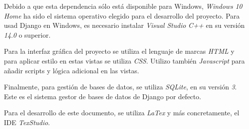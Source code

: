 Debido a que esta dependencia sólo está disponible para Windows, \textit{Windows 10 Home} ha sido el sistema operativo elegido para el desarrollo del proyecto. Para usad Django en Windows, es necesario instalar \textit{Visual Studio C++} en su versión \textit{14.0} o superior. \newline

Para la interfaz gráfica del proyecto se utiliza el lenguaje de marcas \textit{HTML} y para aplicar estilo en estas vistas se utiliza \textit{CSS}. Utilizo también \textit{Javascript} para añadir scripts y lógica adicional en las vistas.\newline

Finalmente, para gestión de bases de datos, se utiliza \textit{SQLite}, en su versión \textit{3}. Este es el sistema gestor de bases de datos de Django por defecto.\newline

Para el desarrollo de este documento, se utiliza \textit{LaTex} y más concretamente, el IDE \textit{TexStudio}. \newline

